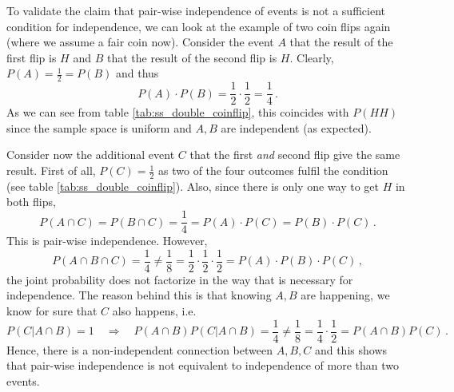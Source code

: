 \begin{ex}
To validate the claim that pair-wise independence of events is not a sufficient condition for independence, we can look at the example of two coin flips again (where we assume a fair coin now). Consider the event $A$ that the result of the first flip is $H$ and $B$ that the result of the second flip is $H$. Clearly, $P(A) = \frac{1}{2} = P(B)$ and thus
\begin{equation*}
P(A) \cdot P(B) = \frac{1}{2} \cdot \frac{1}{2} = \frac{1}{4} \, .
\end{equation*}
As we can see from table \ref{tab:ss_double_coinflip}, this coincides with $P(HH)$ since the sample space is uniform and $A, B$ are independent (as expected).

Consider now the additional event $C$ that the first \emph{and} second flip give the same result. First of all, $P(C) = \frac{1}{2}$ as two of the four outcomes fulfil the condition (see table \ref{tab:ss_double_coinflip}). Also, since there is only one way to get $H$ in both flips,
\begin{equation*}
P(A \cap C) = P(B \cap C) = \frac{1}{4} = P(A) \cdot P(C) = P(B) \cdot P(C) \, .
\end{equation*}
This is pair-wise independence. However,
\begin{equation*}
P(A \cap B \cap C) = \frac{1}{4} \neq \frac{1}{8} = \frac{1}{2} \cdot \frac{1}{2} \cdot \frac{1}{2} = P(A) \cdot P(B) \cdot P(C) \, ,
\end{equation*}
the joint probability does not factorize in the way that is necessary for independence. The reason behind this is that knowing $A, B$ are happening, we know for sure that $C$ also happens, i.e.
\begin{equation*}
P(C | A \cap B) = 1 \quad \Rightarrow \quad P(A \cap B) P(C | A \cap B) = \frac{1}{4} \neq \frac{1}{8} = \frac{1}{4} \cdot \frac{1}{2} =  P(A \cap B) P(C) \, .
\end{equation*}
Hence, there is a non-independent connection between $A, B, C$ and this shows that pair-wise independence is not equivalent to independence of more than two events.
\end{ex}



